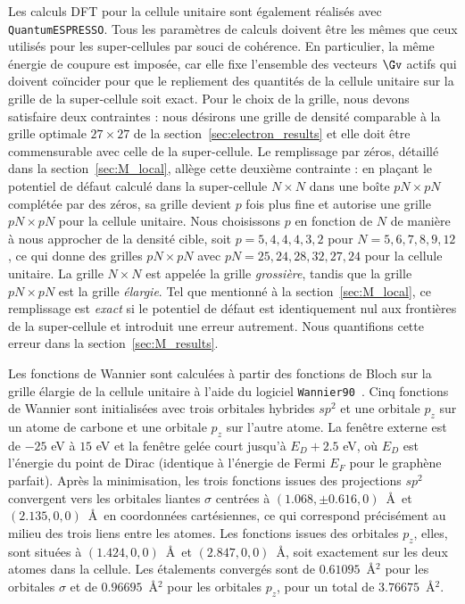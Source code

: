 Les calculs DFT pour la cellule unitaire sont également réalisés avec \texttt{QuantumESPRESSO}. Tous les paramètres de calculs doivent être les mêmes que ceux utilisés pour les super-cellules par souci de cohérence. En particulier, la même énergie de coupure est imposée, car elle fixe l'ensemble des vecteurs $\Gv$ actifs qui doivent coïncider pour que le repliement des quantités de la cellule unitaire sur la grille de la super-cellule soit exact. Pour le choix de la grille, nous devons satisfaire deux contraintes : nous désirons une grille de densité comparable à la grille optimale $27\times27$ de la section~\ref{sec:electron_results} et elle doit être commensurable avec celle de la super-cellule. Le remplissage par zéros, détaillé dans la section~\ref{sec:M_local}, allège cette deuxième contrainte : en
plaçant le potentiel de défaut calculé dans la super-cellule
$N\times N$ dans une boîte $pN\times pN$ complétée par des zéros, sa grille devient $p$ fois plus fine et autorise une grille $pN\times pN$ pour la cellule unitaire. Nous
choisissons $p$ en fonction de $N$ de manière à nous
approcher de la densité cible, soit $p = 5, 4, 4, 4, 3, 2$ pour $N = 5, 6, 7, 8, 9, 12$, ce qui donne des grilles $pN\times pN$ avec $pN = 25, 24, 28, 32, 27, 24$ pour la cellule unitaire. La grille $N\times N$ est appelée la grille \textit{grossière}, tandis que la grille $pN\times pN$ est la grille \textit{élargie}. Tel que mentionné à la section~\ref{sec:M_local}, ce remplissage est \textit{exact} si le potentiel de défaut est identiquement nul aux frontières de la super-cellule et introduit une erreur autrement. Nous quantifions cette erreur dans la section~\ref{sec:M_results}.


Les fonctions de Wannier sont calculées à partir des fonctions de Bloch sur la grille élargie de la cellule unitaire à l'aide du logiciel \texttt{Wannier90}~\cite{mostofiWannier90ToolObtaining2008,mostofiUpdatedVersionWannier902014,pizziWannier90CommunityCode2020}. Cinq fonctions de Wannier sont initialisées avec trois orbitales hybrides $sp^2$ et une orbitale $p_z$ sur un atome de carbone et une orbitale $p_z$ sur l'autre atome. La fenêtre externe est de $-25$ eV à $15$ eV et la fenêtre gelée court jusqu'à $E_D +2.5$ eV, où $E_D$ est l'énergie du point de Dirac (identique à l'énergie de Fermi $E_F$ pour le graphène parfait). Après la minimisation, les trois fonctions issues des projections $sp^2$ convergent vers les orbitales liantes $\sigma$ centrées à $(1.068, \pm0.616, 0)$~\AA~et $(2.135, 0, 0)$~\AA~en coordonnées cartésiennes, ce qui correspond précisément au milieu des trois liens entre les atomes. Les fonctions issues des orbitales $p_z$, elles, sont situées à $(1.424, 0, 0)$~\AA~et $(2.847, 0, 0)$~\AA, soit exactement sur les deux atomes dans la cellule. Les étalements convergés sont de $0.61095$~\AA$^2$ pour les orbitales $\sigma$ et de $0.96695$~\AA$^2$ pour les orbitales $p_z$, pour un total de $3.76675$~\AA$^2$.

